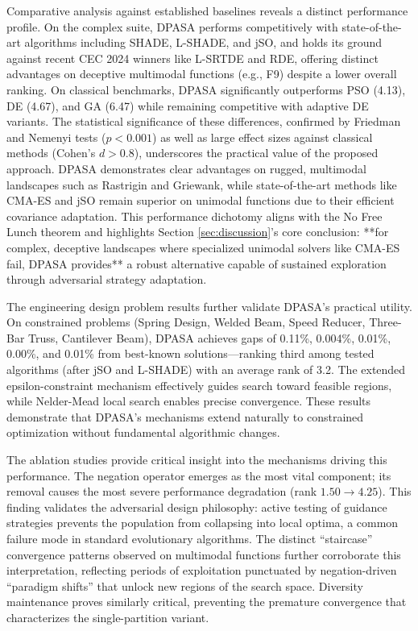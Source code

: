 \documentclass[11pt]{article}
\begin{document}
Comparative analysis against established baselines reveals a distinct performance profile. On the complex suite, DPASA performs competitively with state-of-the-art algorithms including SHADE, L-SHADE, and jSO, and holds its ground against recent CEC 2024 winners like L-SRTDE and RDE, offering distinct advantages on deceptive multimodal functions (e.g., F9) despite a lower overall ranking. On classical benchmarks, DPASA significantly outperforms PSO (4.13), DE (4.67), and GA (6.47) while remaining competitive with adaptive DE variants. The statistical significance of these differences, confirmed by Friedman and Nemenyi tests ($p < 0.001$) as well as large effect sizes against classical methods (Cohen's $d > 0.8$), underscores the practical value of the proposed approach. DPASA demonstrates clear advantages on rugged, multimodal landscapes such as Rastrigin and Griewank, while state-of-the-art methods like CMA-ES and jSO remain superior on unimodal functions due to their efficient covariance adaptation. This performance dichotomy aligns with the No Free Lunch theorem and highlights Section \ref{sec:discussion}'s core conclusion: **for complex, deceptive landscapes where specialized unimodal solvers like CMA-ES fail, DPASA provides** a robust alternative capable of sustained exploration through adversarial strategy adaptation.

The engineering design problem results further validate DPASA's practical utility. On constrained problems (Spring Design, Welded Beam, Speed Reducer, Three-Bar Truss, Cantilever Beam), DPASA achieves gaps of 0.11\%, 0.004\%, 0.01\%, 0.00\%, and 0.01\% from best-known solutions---ranking third among tested algorithms (after jSO and L-SHADE) with an average rank of 3.2. The extended epsilon-constraint mechanism effectively guides search toward feasible regions, while Nelder-Mead local search enables precise convergence. These results demonstrate that DPASA's mechanisms extend naturally to constrained optimization without fundamental algorithmic changes.

The ablation studies provide critical insight into the mechanisms driving this performance. The negation operator emerges as the most vital component; its removal causes the most severe performance degradation (rank $1.50 \to 4.25$). This finding validates the adversarial design philosophy: active testing of guidance strategies prevents the population from collapsing into local optima, a common failure mode in standard evolutionary algorithms. The distinct ``staircase'' convergence patterns observed on multimodal functions further corroborate this interpretation, reflecting periods of exploitation punctuated by negation-driven ``paradigm shifts'' that unlock new regions of the search space. Diversity maintenance proves similarly critical, preventing the premature convergence that characterizes the single-partition variant.
\end{document}
